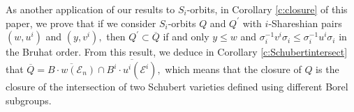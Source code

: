 \documentclass[12pt]{amsart}
\numberwithin{equation}{section}
\newcommand{\ds}{\dot{\sigma}}
\newcommand{\C}{\mbox{${\mathbb C}$}}
\newcommand{\B}{\mathcal{B}}
\begin{document}
    As another application of our results to $S_i$-orbits, in Corollary \ref{c:closure} of this paper, we prove that if we consider $S_i$-orbits $Q$ and $Q^{\prime}$ with $i$-Shareshian pairs $(w,u^{i})$ and $(y,v^{i}),$ then $Q^{\prime} \subset \overline{Q}$ if and only $y \le w$ and $\sigma_{i}^{-1}v^{i}\sigma_{i} \le  \sigma_{i}^{-1}u^{i}\sigma_{i}$ in the Bruhat order.  From this result, we deduce in Corollary \ref{c:Schubertintersect} that $\overline{Q} = \overline{B\cdot w(\mathcal{E}_{n})} \cap \overline{B^{i}\cdot u^{i}(\mathcal{E}^{i})},$ which means that the closure of $Q$ is the closure of the intersection of two Schubert varieties defined using different Borel subgroups.

\end{document}
